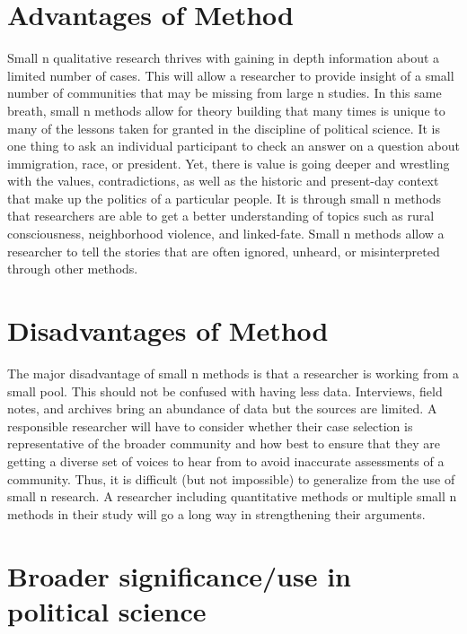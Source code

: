 \documentclass{book}
\begin{document}
\hypertarget{advantages-of-method-3}{%
\section{Advantages of Method}\label{advantages-of-method-3}}

Small n qualitative research thrives with gaining in depth information about a
limited number of cases. This will allow a researcher to provide insight of a
small number of communities that may be missing from large n studies. In this
same breath, small n methods allow for theory building that many times is
unique to many of the lessons taken for granted in the discipline of political
science. It is one thing to ask an individual participant to check an answer
on a question about immigration, race, or president. Yet, there is value is
going deeper and wrestling with the values, contradictions, as well as the
historic and present-day context that make up the politics of a particular
people. It is through small n methods that researchers are able to get a
better understanding of topics such as rural consciousness, neighborhood
violence, and linked-fate. Small n methods allow a researcher to tell the
stories that are often ignored, unheard, or misinterpreted through other
methods.

\hypertarget{disadvantages-of-method-1}{%
\section{Disadvantages of Method}\label{disadvantages-of-method-1}}

The major disadvantage of small n methods is that a researcher is working from
a small pool. This should not be confused with having less data. Interviews,
field notes, and archives bring an abundance of data but the sources are
limited. A responsible researcher will have to consider whether their case
selection is representative of the broader community and how best to ensure
that they are getting a diverse set of voices to hear from to avoid inaccurate
assessments of a community. Thus, it is difficult (but not impossible) to
generalize from the use of small n research. A researcher including
quantitative methods or multiple small n methods in their study will go a long
way in strengthening their arguments.

\hypertarget{broader-significanceuse-in-political-science-4}{%
\section{Broader significance/use in political
science}\label{broader-significanceuse-in-political-science-4}}
\end{document}
